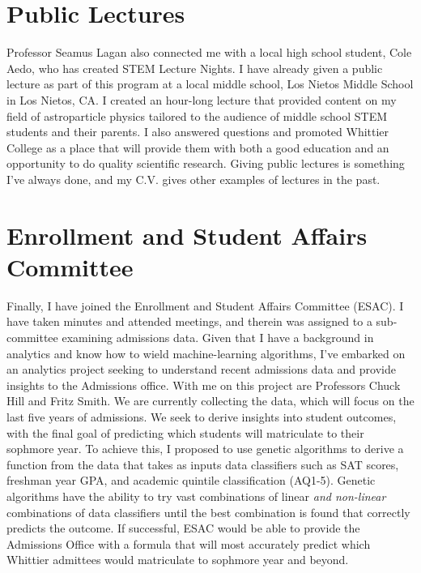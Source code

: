 \documentclass[../main.tex]{subfiles}
\begin{document}
\section{Public Lectures}

Professor Seamus Lagan also connected me with a local high school student, Cole Aedo, who has created STEM Lecture Nights.  I have already given a public lecture as part of this program at a local middle school, Los Nietos Middle School in Los Nietos, CA.  I created an hour-long lecture that provided content on my field of astroparticle physics tailored to the audience of middle school STEM students and their parents.  I also answered questions and promoted Whittier College as a place that will provide them with both a good education and an opportunity to do quality scientific research.  Giving public lectures is something I've always done, and my C.V. gives other examples of lectures in the past.

\section{Enrollment and Student Affairs Committee}

Finally, I have joined the Enrollment and Student Affairs Committee (ESAC).  I have taken minutes and attended meetings, and therein was assigned to a sub-committee examining admissions data.  Given that I have a background in analytics and know how to wield machine-learning algorithms, I've embarked on an analytics project seeking to understand recent admissions data and provide insights to the Admissions office.  With me on this project are Professors Chuck Hill and Fritz Smith.  We are currently collecting the data, which will focus on the last five years of admissions.  We seek to derive insights into student outcomes, with the final goal of predicting which students will matriculate to their sophmore year.  To achieve this, I proposed to use genetic algorithms to derive a function from the data that takes as inputs data classifiers such as SAT scores, freshman year GPA, and academic quintile classification (AQ1-5).  Genetic algorithms have the ability to try vast combinations of linear \textit{and non-linear} combinations of data classifiers until the best combination is found that correctly predicts the outcome.  If successful, ESAC would be able to provide the Admissions Office with a formula that will most accurately predict which Whittier admittees would matriculate to sophmore year and beyond.
\end{document}
